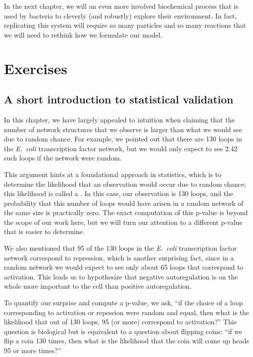 In the next chapter, we will an even more involved biochemical process that is used by bacteria to cleverly (and robustly) explore their environment. In fact, replicating this system will require so many particles and so many reactions that we will need to rethink how we formulate our model.\\

\newpage

\FloatBarrier
\section{Exercises}
\label{sec:exercises}

\subsection{A short introduction to statistical validation}

In this chapter, we have largely appealed to intuition when claiming that the number of network structures that we observe is larger than what we would see due to random chance. For example, we pointed out that there are 130 loops in the \textit{E.~coli} transcription factor network, but we would only expect to see 2.42 such loops if the network were random.

This argument hints at a foundational approach in statistics, which is to determine the likelihood that an observation would occur due to random chance; this likelihood is called a . In this case, our observation is 130 loops, and the probability that this number of loops would have arisen in a random network of the same size is practically zero. The exact computation of this p-value is beyond the scope of our work here, but we will turn our attention to a different p-value that is easier to determine.

We also mentioned that 95 of the 130 loops in the \textit{E.~coli} transcription factor network correspond to repression, which is another surprising fact, since in a random network we would expect to see only about 65 loops that correspond to activation. This leads us to hypothesize that negative autoregulation is on the whole more important to the cell than positive autoregulation.

To quantify our surprise and compute a p-value, we ask, ``if the choice of a loop corresponding to activation or repession were random and equal, then what is the likelihood that out of 130 loops, 95 (or more) correspond to activation?'' This question is biological but is equivalent to a question about flipping coins: ``if we flip a coin 130 times, then what is the likelihood that the coin will come up heads 95 or more times?''

